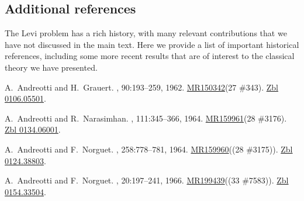 \documentclass[11pt,a4paper, final, twoside]{article}
\numberwithin{equation}{section}
\begin{document}
\newpage
\begin{appendices}
\setcounter{secnumdepth}{0}
\section{Additional references}
The Levi problem has a rich history, with many relevant contributions that we have not discussed in the main text. Here we provide a list of important historical references, including some more recent results that are of interest to the classical theory we have presented.

\renewcommand{\refname}{}
\makeatletter
\def\@biblabel#1{}
\begin{thebibliography}{100}
\vspace{-1cm}

A.~Andreotti and H.~Grauert.
,
  90:193--259, 1962.
\newblock \href{http://www.ams.org/mathscinet-getitem?mr=150342}{MR150342}(27
  \#343). \href{http://zbmath.org/?q=an:0106.05501}{Zbl 0106.05501}.

A.~Andreotti and R.~Narasimhan.
,
  111:345--366, 1964.
\newblock \href{http://www.ams.org/mathscinet-getitem?mr=159961}{MR159961}(28
  \#3176). \href{http://zbmath.org/?q=an:0134.06001}{Zbl 0134.06001}.

A.~Andreotti and F.~Norguet.
, 258:778--781, 1964.
\newblock \href{http://www.ams.org/mathscinet-getitem?mr=159960}{MR159960}((28
  \#3175)). \href{http://zbmath.org/?q=an:0124.38803}{Zbl 0124.38803}.

A.~Andreotti and F.~Norguet.
, 20:197--241, 1966.
\newblock \href{http://www.ams.org/mathscinet-getitem?mr=199439}{MR199439}((33
  \#7583)). \href{http://zbmath.org/?q=an:0154.33504}{Zbl 0154.33504}.


\end{thebibliography}
\end{appendices}
\end{document}
